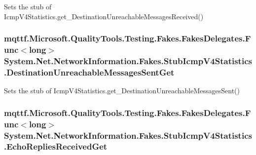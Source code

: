 Sets the stub of Icmp\-V4\-Statistics.\-get\-\_\-\-Destination\-Unreachable\-Messages\-Received()

\hypertarget{class_system_1_1_net_1_1_network_information_1_1_fakes_1_1_stub_icmp_v4_statistics_ac0fe7677e419600e6be110d8a3f87850}{
\subsubsection[{Destination\-Unreachable\-Messages\-Sent\-Get}]{\setlength{\rightskip}{0pt plus 5cm}mqttf.\-Microsoft.\-Quality\-Tools.\-Testing.\-Fakes.\-Fakes\-Delegates.\-Func$<$long$>$ System.\-Net.\-Network\-Information.\-Fakes.\-Stub\-Icmp\-V4\-Statistics.\-Destination\-Unreachable\-Messages\-Sent\-Get}}\label{class_system_1_1_net_1_1_network_information_1_1_fakes_1_1_stub_icmp_v4_statistics_ac0fe7677e419600e6be110d8a3f87850}


Sets the stub of Icmp\-V4\-Statistics.\-get\-\_\-\-Destination\-Unreachable\-Messages\-Sent()

\hypertarget{class_system_1_1_net_1_1_network_information_1_1_fakes_1_1_stub_icmp_v4_statistics_a71b4b70b9d8d49be1e0bb3fa305d84bd}{
\subsubsection[{Echo\-Replies\-Received\-Get}]{\setlength{\rightskip}{0pt plus 5cm}mqttf.\-Microsoft.\-Quality\-Tools.\-Testing.\-Fakes.\-Fakes\-Delegates.\-Func$<$long$>$ System.\-Net.\-Network\-Information.\-Fakes.\-Stub\-Icmp\-V4\-Statistics.\-Echo\-Replies\-Received\-Get}}\label{class_system_1_1_net_1_1_network_information_1_1_fakes_1_1_stub_icmp_v4_statistics_a71b4b70b9d8d49be1e0bb3fa305d84bd}


